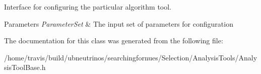 Interface for configuring the particular algorithm tool. 


\begin{DoxyParams}{Parameters}
{\em Parameter\+Set} & The input set of parameters for configuration \\
\hline
\end{DoxyParams}


The documentation for this class was generated from the following file\+:\begin{DoxyCompactItemize}
\item 
/home/travis/build/ubneutrinos/searchingfornues/\+Selection/\+Analysis\+Tools/Analysis\+Tool\+Base.\+h\end{DoxyCompactItemize}
